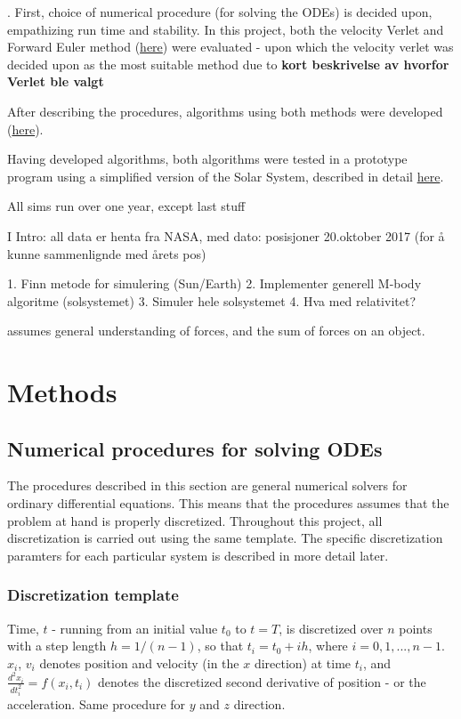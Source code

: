 \documentclass[%
oneside,                 %
final,                   %
10pt]{article}
\begin{document}
. \newline
First, choice of numerical procedure (for solving the ODEs) is decided upon, empathizing run time and stability. In this project, both the velocity Verlet and Forward Euler method (\hyperref[sec:NPs]{here}) were evaluated - upon which the velocity verlet was decided upon as the most suitable method due to \textbf{kort beskrivelse av hvorfor Verlet ble valgt}\newline

After describing the procedures, algorithms using both methods were developed (\hyperref[sec:NPalgo]{here}). \newline

Having developed algorithms, both algorithms were tested in a prototype program using a simplified version of the Solar System, described in detail \hyperref[sec:NPalgo]{here}.


All sims run over one year, except last stuff

I Intro: all data er henta fra NASA, med dato: posisjoner 20.oktober 2017 (for å kunne sammenlignde med årets pos)


1. Finn metode for simulering (Sun/Earth)
2. Implementer generell M-body algoritme (solsystemet)
3. Simuler hele solsystemet
4. Hva med relativitet?

assumes general understanding of forces, and the sum of forces on an object.
\section{Methods}

\subsection{Numerical procedures for solving ODEs}
\label{sec:NPs}
The procedures \cite{HJ-ODE} described in this section are general numerical solvers for ordinary differential equations. This means that the procedures assumes that the problem at hand is properly discretized.  Throughout this project, all discretization is carried out using the same template. The specific discretization paramters for each particular system is described in more detail later.  \newline

\subsubsection*{Discretization template}
Time, $t$ - running from an initial value $t_0$ to $t=T$,  is discretized over $n$ points with a step length $h=1/(n-1)$, so that $t_i=t_0 + ih$, where $i=0,1,...,n-1$. $x_i$, $v_i$ denotes position and velocity (in the $x$ direction) at time $t_i$, and $\frac{d^2x_i}{dt_i^2}=f(x_i,t_i)$ denotes the discretized second derivative of position - or the acceleration. Same procedure for $y$ and $z$ direction.
\end{document}
